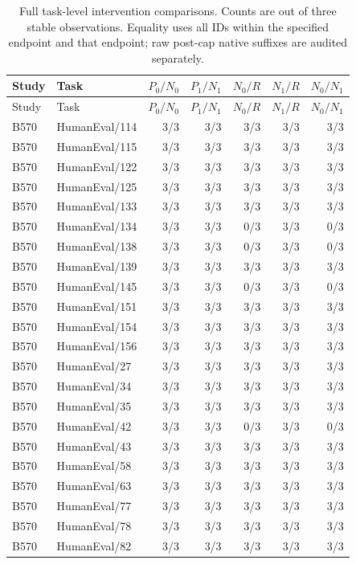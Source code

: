 \begin{longtable}{@{}llrrrrr@{}}
\caption{Full task-level intervention comparisons. Counts are out of three stable observations. Equality uses all IDs within the specified endpoint and that endpoint; raw post-cap native suffixes are audited separately.}\\
\toprule Study & Task & $P_0/N_0$ & $P_1/N_1$ & $N_0/R$ & $N_1/R$ & $N_0/N_1$\\\midrule\endfirsthead
\toprule Study & Task & $P_0/N_0$ & $P_1/N_1$ & $N_0/R$ & $N_1/R$ & $N_0/N_1$\\\midrule\endhead
B570 & HumanEval/114 & 3/3 & 3/3 & 3/3 & 3/3 & 3/3 \\
B570 & HumanEval/115 & 3/3 & 3/3 & 3/3 & 3/3 & 3/3 \\
B570 & HumanEval/122 & 3/3 & 3/3 & 3/3 & 3/3 & 3/3 \\
B570 & HumanEval/125 & 3/3 & 3/3 & 3/3 & 3/3 & 3/3 \\
B570 & HumanEval/133 & 3/3 & 3/3 & 3/3 & 3/3 & 3/3 \\
B570 & HumanEval/134 & 3/3 & 3/3 & 0/3 & 3/3 & 0/3 \\
B570 & HumanEval/138 & 3/3 & 3/3 & 0/3 & 3/3 & 0/3 \\
B570 & HumanEval/139 & 3/3 & 3/3 & 3/3 & 3/3 & 3/3 \\
B570 & HumanEval/145 & 3/3 & 3/3 & 0/3 & 3/3 & 0/3 \\
B570 & HumanEval/151 & 3/3 & 3/3 & 3/3 & 3/3 & 3/3 \\
B570 & HumanEval/154 & 3/3 & 3/3 & 3/3 & 3/3 & 3/3 \\
B570 & HumanEval/156 & 3/3 & 3/3 & 3/3 & 3/3 & 3/3 \\
B570 & HumanEval/27 & 3/3 & 3/3 & 3/3 & 3/3 & 3/3 \\
B570 & HumanEval/34 & 3/3 & 3/3 & 3/3 & 3/3 & 3/3 \\
B570 & HumanEval/35 & 3/3 & 3/3 & 3/3 & 3/3 & 3/3 \\
B570 & HumanEval/42 & 3/3 & 3/3 & 0/3 & 3/3 & 0/3 \\
B570 & HumanEval/43 & 3/3 & 3/3 & 3/3 & 3/3 & 3/3 \\
B570 & HumanEval/58 & 3/3 & 3/3 & 3/3 & 3/3 & 3/3 \\
B570 & HumanEval/63 & 3/3 & 3/3 & 3/3 & 3/3 & 3/3 \\
B570 & HumanEval/77 & 3/3 & 3/3 & 3/3 & 3/3 & 3/3 \\
B570 & HumanEval/78 & 3/3 & 3/3 & 3/3 & 3/3 & 3/3 \\
B570 & HumanEval/82 & 3/3 & 3/3 & 3/3 & 3/3 & 3/3 \\

\end{longtable}
